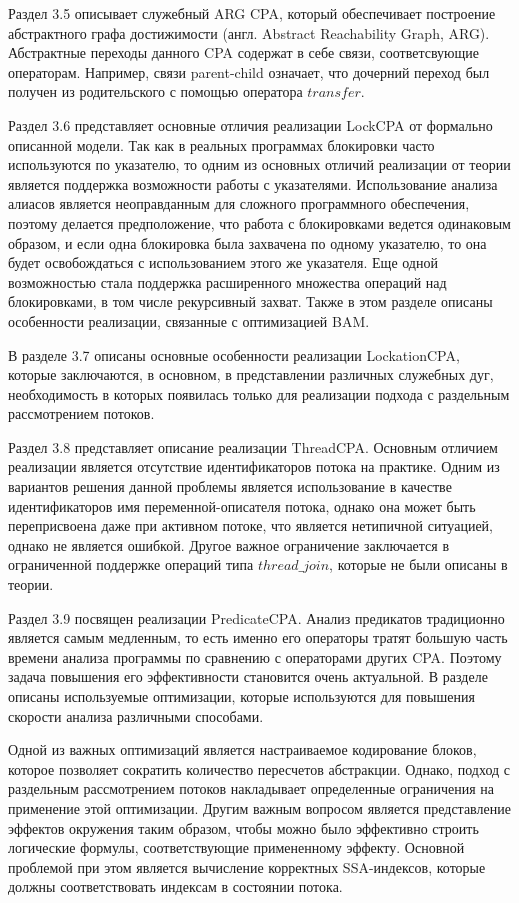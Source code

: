 Раздел 3.5 описывает служебный ARG CPA, который обеспечивает построение абстрактного графа достижимости (англ. Abstract Reachability Graph, ARG).
Абстрактные переходы данного CPA содержат в себе связи, соответсвующие операторам.
Например, связи parent-child означает, что дочерний переход был получен из родительского с помощью оператора $transfer$.

Раздел 3.6 представляет основные отличия реализации LockCPA от формально описанной модели. 
Так как в реальных программах блокировки часто используются по указателю, то одним из основных отличий реализации от теории является поддержка возможности работы с указателями.
Использование анализа алиасов является неоправданным для сложного программного обеспечения, поэтому делается предположение, что работа с блокировками ведется одинаковым образом, и если одна блокировка была захвачена по одному указателю, то она будет освобождаться с использованием этого же указателя.
Еще одной возможностью стала поддержка расширенного множества операций над блокировками, в том числе рекурсивный захват.
Также в этом разделе описаны особенности реализации, связанные с оптимизацией BAM.

В разделе 3.7 описаны основные особенности реализации LockationCPA, которые заключаются, в основном, в представлении различных служебных дуг, необходимость в которых появилась только для реализации подхода с раздельным рассмотрением потоков.

Раздел 3.8 представляет описание реализации ThreadCPA.
Основным отличием реализации является отсутствие идентификаторов потока на практике. 
Одним из вариантов решения данной проблемы является использование в качестве идентификаторов имя переменной-описателя потока, однако она может быть переприсвоена даже при активном потоке, что является нетипичной ситуацией, однако не является ошибкой.
Другое важное ограничение заключается в ограниченной поддержке операций типа $thread\_join$, которые не были описаны в теории.

Раздел 3.9 посвящен реализации PredicateCPA.
Анализ предикатов традиционно является самым медленным, то есть именно его операторы тратят большую часть времени анализа программы по сравнению с операторами других CPA.
Поэтому задача повышения его эффективности становится очень актуальной.
В разделе описаны используемые оптимизации, которые используются для повышения скорости анализа различными способами.

Одной из важных оптимизаций является настраиваемое кодирование блоков, которое позволяет сократить количество пересчетов абстракции. 
Однако, подход с раздельным рассмотрением потоков накладывает определенные ограничения на применение этой оптимизации.
Другим важным вопросом является представление эффектов окружения таким образом, чтобы можно было эффективно строить логические формулы, соответствующие примененному эффекту.
Основной проблемой при этом является вычисление корректных SSA-индексов, которые должны соответствовать индексам в состоянии потока.

